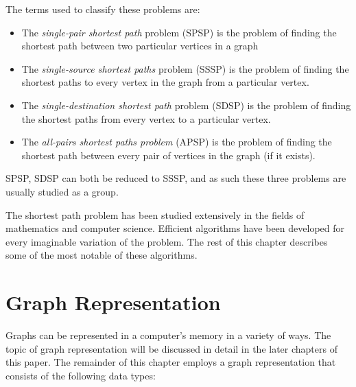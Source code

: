 \documentclass[12pt,twoside]{reedthesis}
\newcommand{\im}[1]{{\em#1}}
\begin{document}
The terms used to classify these problems are:

\begin{itemize}
\item
The \im{single-pair shortest path} problem (SPSP) is the problem of finding the shortest path between two particular vertices in a graph
\item
The \im{single-source shortest paths} problem (SSSP) is the problem of finding the shortest paths to every vertex in the graph from a particular vertex.
\item The \im{single-destination shortest path} problem (SDSP) is the problem of finding the shortest paths from every vertex to a particular vertex.
\item The \im{all-pairs shortest paths problem} (APSP) is the problem of finding the shortest path between every pair of vertices in the graph (if it exists).
\end{itemize}

SPSP, SDSP can both be reduced to SSSP, and as such these three problems are usually studied as a group.

The shortest path problem has been studied extensively in the fields of mathematics and computer science. Efficient algorithms have been developed for every imaginable variation of the problem. The rest of this chapter describes some of the most notable of these algorithms.

\section{Graph Representation}

Graphs can be represented in a computer's memory in a variety of ways. The topic of graph representation will be discussed in detail in the later chapters of this paper. The remainder of this chapter employs a graph representation that consists of the following data types:
\end{document}
